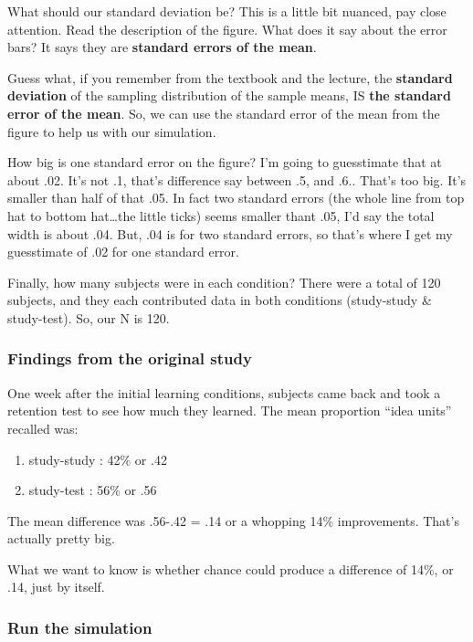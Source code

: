 \documentclass[]{book}
\providecommand{\tightlist}{%
  \setlength{\itemsep}{0pt}\setlength{\parskip}{0pt}}
\theoremstyle{definition}
\theoremstyle{definition}
\theoremstyle{definition}
\theoremstyle{remark}
\begin{document}
What should our standard deviation be? This is a little bit nuanced, pay
close attention. Read the description of the figure. What does it say
about the error bars? It says they are \textbf{standard errors of the
mean}.

Guess what, if you remember from the textbook and the lecture, the
\textbf{standard deviation} of the sampling distribution of the sample
means, IS \textbf{the standard error of the mean}. So, we can use the
standard error of the mean from the figure to help us with our
simulation.

How big is one standard error on the figure? I'm going to guesstimate
that at about .02. It's not .1, that's difference say between .5, and
.6.. That's too big. It's smaller than half of that .05. In fact two
standard errors (the whole line from top hat to bottom hat\ldots{}the
little ticks) seems smaller thant .05, I'd say the total width is about
.04. But, .04 is for two standard errors, so that's where I get my
guesstimate of .02 for one standard error.

Finally, how many subjects were in each condition? There were a total of
120 subjects, and they each contributed data in both conditions
(study-study \& study-test). So, our N is 120.

\subsubsection{Findings from the original
study}\label{findings-from-the-original-study}

One week after the initial learning conditions, subjects came back and
took a retention test to see how much they learned. The mean proportion
``idea units'' recalled was:

\begin{enumerate}
\def\labelenumi{\arabic{enumi}.}
\tightlist
\item
  study-study : 42\% or .42
\item
  study-test : 56\% or .56
\end{enumerate}

The mean difference was .56-.42 = .14 or a whopping 14\% improvements.
That's actually pretty big.

What we want to know is whether chance could produce a difference of
14\%, or .14, just by itself.

\subsubsection{Run the simulation}\label{run-the-simulation}
\end{document}
